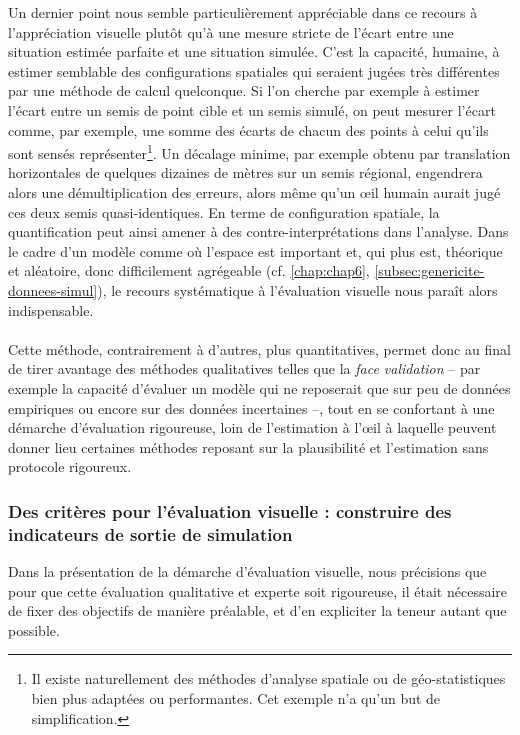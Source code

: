Un dernier point nous semble particulièrement appréciable dans ce recours à l'appréciation visuelle plutôt qu'à une mesure stricte de l'écart entre une situation estimée parfaite et une situation simulée.
C'est la capacité, humaine, à estimer semblable des configurations spatiales qui seraient jugées très différentes par une méthode de calcul quelconque.
Si l'on cherche par exemple à estimer l'écart entre un semis de point cible et un semis simulé, on peut mesurer l'écart comme, par exemple, une somme des écarts de chacun des points à celui qu'ils sont sensés représenter\footnote{
	Il existe naturellement des méthodes d'analyse spatiale ou de géo-statistiques bien plus adaptées ou performantes.
	Cet exemple n'a qu'un but de simplification.
}.
Un décalage minime, par exemple obtenu par translation horizontales de quelques dizaines de mètres sur un semis régional, engendrera alors une démultiplication des erreurs, alors même qu'un œil humain aurait jugé ces deux semis quasi-identiques.
En terme de configuration spatiale, la quantification peut ainsi amener à des contre-interprétations dans l'analyse.
Dans le cadre d'un modèle comme \simfeodal{} où l'espace est important et, qui plus est, théorique et aléatoire, donc difficilement agrégeable (cf. \cref{chap:chap6}, \cref{subsec:genericite-donnees-simul}), le recours systématique à l'évaluation visuelle nous paraît alors indispensable.

\paragraph*{}Cette méthode, contrairement à d'autres, plus quantitatives, permet donc au final de tirer avantage des méthodes qualitatives telles que la \textit{face validation} -- par exemple la capacité d'évaluer un modèle qui ne reposerait que sur peu de données empiriques ou encore sur des données incertaines --, tout en se confortant à une démarche d'évaluation rigoureuse, loin de l'estimation \og à l'œil\fg{} à laquelle peuvent donner lieu certaines méthodes reposant sur la plausibilité et l'estimation sans protocole rigoureux.

\subsubsection{Des critères pour l'évaluation visuelle : construire des indicateurs de sortie de simulation}

Dans la présentation de la démarche d'évaluation visuelle, nous précisions que pour que cette évaluation qualitative et experte soit rigoureuse, il était nécessaire de fixer des objectifs de manière préalable, et d'en expliciter la teneur autant que possible.

